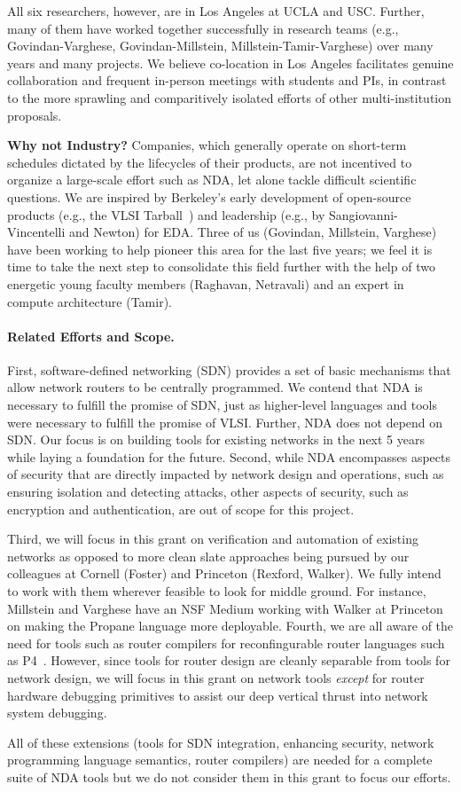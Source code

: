 All six researchers, however, are in Los Angeles at UCLA and USC. Further, many of them have worked together successfully in research teams (e.g., Govindan-Varghese, Govindan-Millstein, Millstein-Tamir-Varghese) over many years and many projects. We believe co-location in Los Angeles facilitates genuine collaboration and frequent in-person meetings with students and PIs, in contrast to the more sprawling and comparitively isolated efforts of other multi-institution proposals.

{\bf Why not Industry?} Companies, which generally operate on short-term schedules dictated by the lifecycles of their products, are not incentived to organize a large-scale effort such as NDA, let alone tackle difficult scientific questions. We are inspired by Berkeley's early development of open-source products (e.g., the VLSI Tarball~\cite{wikicite}) and leadership (e.g., by Sangiovanni-Vincentelli and Newton) for EDA.  Three of us (Govindan, Millstein, Varghese) have been working to help pioneer this area for the last five years; we feel it is time to take the next step to consolidate this field further with the help of two energetic young faculty members (Raghavan, Netravali) and an expert in compute architecture (Tamir).

\paragraph*{Related Efforts and Scope.}
%
First, software-defined networking (SDN) provides a set of basic mechanisms that allow network routers to be centrally programmed.  We contend that NDA is necessary to fulfill the promise of SDN, just as higher-level languages and tools were necessary to fulfill the promise of VLSI. Further, NDA does not depend on SDN. Our focus is on building tools for existing networks in the next 5 years while laying a foundation for the future. Second, while NDA encompasses aspects of security that are directly impacted by network design and operations, such as ensuring isolation and detecting attacks, other aspects of security, such as encryption and authentication, are out of scope for this project.  

Third, we will focus in this grant on verification and automation of 
existing networks as opposed to more clean slate
approaches being pursued by our colleagues at Cornell (Foster) and Princeton (Rexford, Walker).  We fully intend to work with them wherever feasible to look for middle ground. For instance, Millstein and Varghese have an NSF Medium working with Walker at Princeton on making the Propane language more deployable. Fourth, we are all aware of the need for tools such as router compilers for reconfingurable router languages such as  P4~\cite{P4}. However, since tools for router design are cleanly separable from tools for network design, we will focus in this grant on
network tools {\em except} for router hardware debugging primitives to
assist our deep vertical thrust into network system debugging.

All of these extensions (tools for SDN integration, enhancing security, network 
programming language semantics, router compilers) are needed for a complete suite of NDA tools but we do not consider them in this grant to focus our efforts.

